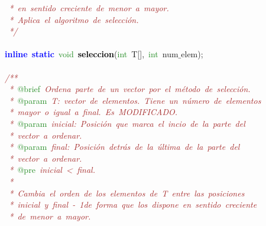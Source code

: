 \mbox{}\textit{\textcolor{Brown}{\ *\ en\ sentido\ creciente\ de\ menor\ a\ mayor.}} \\
\mbox{}\textit{\textcolor{Brown}{\ *\ Aplica\ el\ algoritmo\ de\ selección.}} \\
\mbox{}\textit{\textcolor{Brown}{\ */}} \\
\mbox{} \\
\mbox{}\textbf{\textcolor{Blue}{inline}}\ \textbf{\textcolor{Blue}{static}}\ \textcolor{ForestGreen}{void}\ \textbf{\textcolor{Black}{seleccion}}\textcolor{BrickRed}{(}\textcolor{ForestGreen}{int}\ T\textcolor{BrickRed}{[],}\ \textcolor{ForestGreen}{int}\ num$\_$elem\textcolor{BrickRed}{);} \\
\mbox{} \\
\mbox{}\textit{\textcolor{Brown}{/**}} \\
\mbox{}\textit{\textcolor{Brown}{\ *\ }}\textcolor{ForestGreen}{@brief}\textit{\textcolor{Brown}{\ Ordena\ parte\ de\ un\ vector\ por\ el\ método\ de\ selección.}} \\
\mbox{}\textit{\textcolor{Brown}{\ *\ }}\textcolor{ForestGreen}{@param}\textit{\textcolor{Brown}{\ T:\ vector\ de\ elementos.\ Tiene\ un\ número\ de\ elementos\ }} \\
\mbox{}\textit{\textcolor{Brown}{\ *\ mayor\ o\ igual\ a\ final.\ Es\ MODIFICADO.}} \\
\mbox{}\textit{\textcolor{Brown}{\ *\ }}\textcolor{ForestGreen}{@param}\textit{\textcolor{Brown}{\ inicial:\ Posición\ que\ marca\ el\ incio\ de\ la\ parte\ del}} \\
\mbox{}\textit{\textcolor{Brown}{\ *\ vector\ a\ ordenar.}} \\
\mbox{}\textit{\textcolor{Brown}{\ *\ }}\textcolor{ForestGreen}{@param}\textit{\textcolor{Brown}{\ final:\ Posición\ detrás\ de\ la\ última\ de\ la\ parte\ del}} \\
\mbox{}\textit{\textcolor{Brown}{\ *\ vector\ a\ ordenar.\ }} \\
\mbox{}\textit{\textcolor{Brown}{\ *\ }}\textcolor{ForestGreen}{@pre}\textit{\textcolor{Brown}{\ inicial\ \textless{}\ final.}} \\
\mbox{}\textit{\textcolor{Brown}{\ *\ }} \\
\mbox{}\textit{\textcolor{Brown}{\ *\ Cambia\ el\ orden\ de\ los\ elementos\ de\ T\ entre\ las\ posiciones}} \\
\mbox{}\textit{\textcolor{Brown}{\ *\ inicial\ y\ final\ -\ 1de\ forma\ que\ los\ dispone\ en\ sentido\ creciente}} \\
\mbox{}\textit{\textcolor{Brown}{\ *\ de\ menor\ a\ mayor.}} \\
